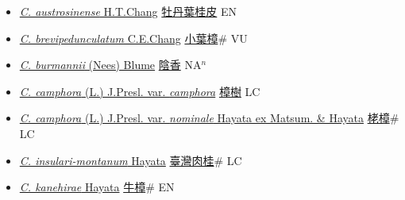 \begin{itemize}
  \begin{itemize}
        \item[] \href{http://www.theplantlist.org/tpl1.1/search?q=Cinnamomum+austrosinense}{\textit{C. austrosinense} H.T.Chang}   \href{\detokenize{http://taibnet.sinica.edu.tw/chi/taibnet_species_list.php?T2=牡丹葉桂皮&T2_new_value=true&fr=y}}{牡丹葉桂皮} EN
        \item[] \href{http://www.theplantlist.org/tpl1.1/search?q=Cinnamomum+brevipedunculatum}{\textit{C. brevipedunculatum} C.E.Chang}   \href{\detokenize{http://taibnet.sinica.edu.tw/chi/taibnet_species_list.php?T2=小葉樟&T2_new_value=true&fr=y}}{小葉樟}\# VU
        \item[] \href{http://www.theplantlist.org/tpl1.1/search?q=Cinnamomum+burmannii}{\textit{C. burmannii} (Nees) Blume}   \href{\detokenize{http://taibnet.sinica.edu.tw/chi/taibnet_species_list.php?T2=陰香&T2_new_value=true&fr=y}}{陰香} NA$^n$
        \item[] \href{http://www.theplantlist.org/tpl1.1/search?q=Cinnamomum+camphora+var.+camphora}{\textit{C. camphora} (L.) J.Presl. var. \textit{camphora}}   \href{\detokenize{http://taibnet.sinica.edu.tw/chi/taibnet_species_list.php?T2=樟樹&T2_new_value=true&fr=y}}{樟樹} LC
        \item[] \href{http://www.theplantlist.org/tpl1.1/search?q=Cinnamomum+camphora+var.+nominale}{\textit{C. camphora} (L.) J.Presl. var. \textit{nominale} Hayata ex Matsum. \& Hayata}   \href{\detokenize{http://taibnet.sinica.edu.tw/chi/taibnet_species_list.php?T2=栳樟&T2_new_value=true&fr=y}}{栳樟}\# LC
        \item[] \href{http://www.theplantlist.org/tpl1.1/search?q=Cinnamomum+insulari-montanum}{\textit{C. insulari-montanum} Hayata}   \href{\detokenize{http://taibnet.sinica.edu.tw/chi/taibnet_species_list.php?T2=臺灣肉桂&T2_new_value=true&fr=y}}{臺灣肉桂}\# LC
        \item[] \href{http://www.theplantlist.org/tpl1.1/search?q=Cinnamomum+kanehirae}{\textit{C. kanehirae} Hayata}   \href{\detokenize{http://taibnet.sinica.edu.tw/chi/taibnet_species_list.php?T2=牛樟&T2_new_value=true&fr=y}}{牛樟}\# EN

\end{itemize}
\end{itemize}
